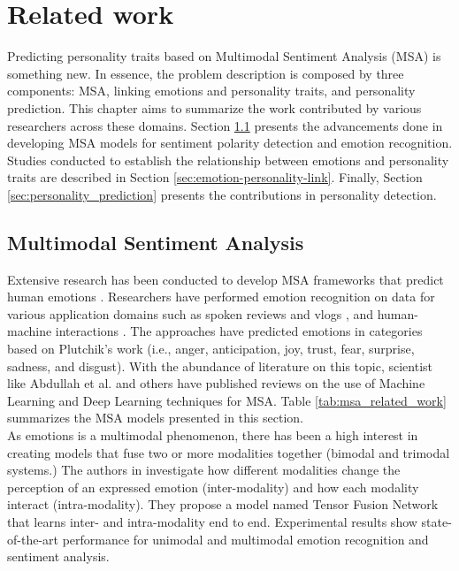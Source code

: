 \chapter{Related work}
\label{chap:related_work}
Predicting personality traits based on Multimodal Sentiment Analysis (MSA) is something new. In essence, the problem description is composed by three components: MSA, linking emotions and personality traits, and personality prediction. This chapter aims to summarize the work contributed by various researchers across these domains. Section \ref{sec:msa_related} presents the advancements done in developing MSA models for sentiment polarity detection and emotion recognition. Studies conducted to establish the relationship between emotions and personality traits are described in Section \ref{sec:emotion-personality-link}. Finally, Section \ref{sec:personality_prediction} presents the contributions in personality detection. 

\section{Multimodal Sentiment Analysis}
\label{sec:msa_related}
Extensive research has been conducted to develop MSA frameworks that predict human emotions \cite{sebe2005multimodal}. Researchers have performed emotion recognition on data for various application domains such as spoken reviews and vlogs \cite{wollmer2013youtube}, and human-machine interactions \cite{human_machine_langlet2015}. The approaches have predicted emotions in categories based on Plutchik's work (i.e., anger, anticipation, joy, trust, fear, surprise, sadness, and disgust). With the abundance of literature on this topic, scientist like Abdullah et al. \cite{DL_abdullah2021multimodal} and others \cite{sebe2005multimodal} \cite{MER_book_Sharma2021} have published reviews on the use of Machine Learning and Deep Learning techniques for MSA. Table \ref{tab:msa_related_work} summarizes the MSA models presented in this section.  \\ 

As emotions is a multimodal phenomenon, there has been a high interest in creating models that fuse two or more modalities together (bimodal and trimodal systems.) The authors in \cite{tensor_fusion_network_2017} investigate how different modalities change the perception of an expressed emotion (inter-modality) and how each modality interact (intra-modality). They propose a model named Tensor Fusion Network that learns inter- and intra-modality end to end. Experimental results show state-of-the-art performance for unimodal and multimodal emotion recognition and sentiment analysis. \\

